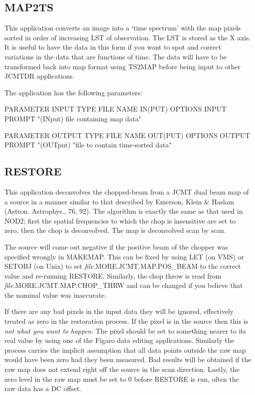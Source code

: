 \documentclass[twoside,11pt,nolof]{starlink}
\begin{document}
\goodbreak

\subsection{MAP2TS}

This application converts an image into a `time spectrum' with the map
pixels sorted in order of increasing LST of observation. The LST is
stored as  the X axis. It is useful to have the data in this form if
you want to spot and correct variations in the data that are functions
of time. The data will have to be transformed back into map format
using TS2MAP before being input to other JCMTDR applications.

\goodbreak

The application has the following parameters:

\begin{small}
\begin{terminalv}
PARAMETER  INPUT
  TYPE    FILE
  NAME    IN(PUT)
  OPTIONS INPUT
  PROMPT  "(INput) file containing map data"

PARAMETER  OUTPUT
  TYPE    FILE
  NAME    OUT(PUT)
  OPTIONS OUTPUT
  PROMPT  "(OUTput) "file to contain time-sorted data"
\end{terminalv}
\end{small}


\goodbreak

\subsection{RESTORE}

This application deconvolves the chopped-beam from a JCMT dual  beam
map of a source in a manner similar to that described by  Emerson,
Klein \& Haslam (Astron. Astrophys., 76, 92). The algorithm  is exactly
the same as that used in NOD2; first the spatial  frequencies to which
the chop is insensitive are set to zero,  then the chop is
deconvolved. The map is deconvolved scan by scan.

The source will come out negative if the positive beam of the chopper
was specified wrongly in MAKEMAP. This can be fixed by using LET (on
VMS) or SETOBJ (on Unix) to
set \emph{file}.MORE.JCMT.\-MAP.POS\_BEAM to the correct value and
re-running RESTORE. Similarly, the chop throw  is read from \emph{file}.MORE.\-JCMT.\-MAP.CHOP\_THRW and can be changed if you  believe that
the nominal value was inaccurate.

If there are any bad pixels in the input data they will be ignored,
effectively treated as zero in the restoration process. If the pixel
is in the source then this is \emph{not what you want to happen}. The
pixel should be set to something nearer to its real value by using one
of the Figaro data editing applications. Similarly  the process
carries the implicit assumption that all data points outside the raw
map would have been zero had they been measured. Bad results will be
obtained if the raw map does not extend right off the source in the
scan direction. Lastly, the zero level in the raw map must be set to 0
before RESTORE is run, often the raw data has a DC offset.
\end{document}

